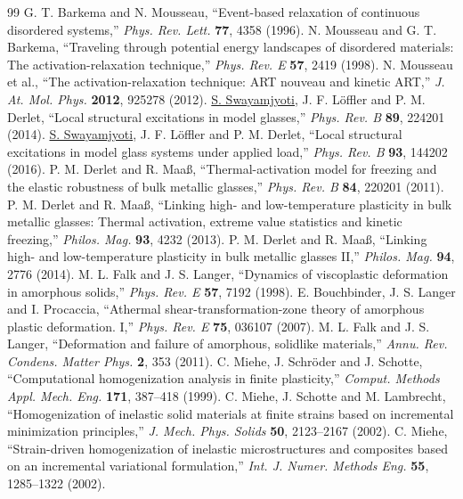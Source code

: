 \documentclass[11pt,a4paper]{article}
\begin{document}
\begin{thebibliography}{99}
 G. T. Barkema and N. Mousseau, ``Event-based relaxation of continuous disordered systems,'' \emph{Phys. Rev. Lett.} \textbf{77}, 4358 (1996).
 N. Mousseau and G. T. Barkema, ``Traveling through potential energy landscapes of disordered materials: The activation-relaxation technique,'' \emph{Phys. Rev. E} \textbf{57}, 2419 (1998).
 N. Mousseau et al., ``The activation-relaxation technique: ART nouveau and kinetic ART,'' \emph{J. At. Mol. Phys.} \textbf{2012}, 925278 (2012).
 \underline{S. Swayamjyoti}, J. F. L\"offler and P. M. Derlet, ``Local structural excitations in model glasses,'' \emph{Phys. Rev. B} \textbf{89}, 224201 (2014).
 \underline{S. Swayamjyoti}, J. F. L\"offler and P. M. Derlet, ``Local structural excitations in model glass systems under applied load,'' \emph{Phys. Rev. B} \textbf{93}, 144202 (2016).
 P. M. Derlet and R. Maa\ss{}, ``Thermal-activation model for freezing and the elastic robustness of bulk metallic glasses,'' \emph{Phys. Rev. B} \textbf{84}, 220201 (2011).
 P. M. Derlet and R. Maa\ss{}, ``Linking high- and low-temperature plasticity in bulk metallic glasses: Thermal activation, extreme value statistics and kinetic freezing,'' \emph{Philos. Mag.} \textbf{93}, 4232 (2013).
 P. M. Derlet and R. Maa\ss{}, ``Linking high- and low-temperature plasticity in bulk metallic glasses II,'' \emph{Philos. Mag.} \textbf{94}, 2776 (2014).
 M. L. Falk and J. S. Langer, ``Dynamics of viscoplastic deformation in amorphous solids,'' \emph{Phys. Rev. E} \textbf{57}, 7192 (1998).
 E. Bouchbinder, J. S. Langer and I. Procaccia, ``Athermal shear-transformation-zone theory of amorphous plastic deformation. I,'' \emph{Phys. Rev. E} \textbf{75}, 036107 (2007).
 M. L. Falk and J. S. Langer, ``Deformation and failure of amorphous, solidlike materials,'' \emph{Annu. Rev. Condens. Matter Phys.} \textbf{2}, 353 (2011).
 C. Miehe, J. Schr\"oder and J. Schotte, ``Computational homogenization analysis in finite plasticity,'' \emph{Comput. Methods Appl. Mech. Eng.} \textbf{171}, 387--418 (1999).
 C. Miehe, J. Schotte and M. Lambrecht, ``Homogenization of inelastic solid materials at finite strains based on incremental minimization principles,'' \emph{J. Mech. Phys. Solids} \textbf{50}, 2123--2167 (2002).
 C. Miehe, ``Strain-driven homogenization of inelastic microstructures and composites based on an incremental variational formulation,'' \emph{Int. J. Numer. Methods Eng.} \textbf{55}, 1285--1322 (2002).

\end{thebibliography}
\end{document}
